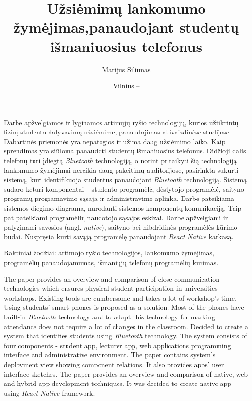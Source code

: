 \documentclass{VUMIFPSbakalaurinis}
\title{Užsiėmimų lankomumo žymėjimas,\break panaudojant studentų išmaniuosius telefonus}
\author{Marijus Siliūnas}
\date{Vilnius – \the\year}
\begin{document}
\maketitle


Darbe apžvelgiamos ir lyginamos artimųjų ryšio technologijų, kurios užtikrintų fizinį studento dalyvavimą užsiėmime, panaudojimas akivaizdinėse studijose. Dabartinės priemonės yra nepatogios ir užima daug užsiėmimo laiko. Kaip sprendimas yra siūloma panaudoti studentų išmaniuosius telefonus. Didžioji dalis telefonų turi įdiegtą \textit{Bluetooth} technologiją, o norint pritaikyti šią technologiją lankomumo žymėjimui nereikia daug pakeitimų auditorijose, pasirinkta sukurti sistemą, kuri identifikuoja studentus panaudojant \textit{Bluetooth} technologiją. Sistemą sudaro keturi komponentai – studento programėlė, dėstytojo programėlė, saityno programų programavimo sąsaja ir administravimo aplinka. Darbe pateikiama sistemos diegimo diagrama, nurodanti sistemos komponentų komunikaciją. Taip pat pateikiami programėlių naudotojo sąsajos eskizai. Darbe apžvelgiami ir palyginami savosios (angl. \textit{native}), saityno bei hibdridinės programėlės kūrimo būdai. Nuspręsta kurti savąją programėlę panaudojant \textit{React Native} karkasą.

Raktiniai žodžiai: artimojo ryšio technologijos, lankomumo žymėjimas, programėlių panaudojamumas, išmaniųjų telefonų programėlių kūrimas.


The paper provides an overview and comparison of close communication technologies which ensures physical student participation in universities workshops.
Existing tools are cumbersome and takes a lot of workshop's time. Using students' smart phones is proposed as a solution. Most of the phones have built-in \textit{Bluetooth} technology and to adapt this technology for marking attendance does not require a lot of changes in the classroom. Decided to create a system that identifies students using \textit{Bluetooth} technology. The system consists of four components - student app, lecturer app, web applications programming interface and administrative environment. The paper contains system's deployment view showing component relations. It also provides apps' user interface sketches. The paper provides an overview and comparison of native, web and hybrid app development techniques. It was decided to create native app using \textit{React Native} framework.
\end{document}
